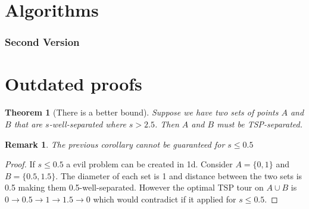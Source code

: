 \documentclass{article}
\newtheorem{thm}{Theorem}[section]
\newtheorem*{rem*}{Remark}
\theoremstyle{definition}
\begin{document}
\section{Algorithms}











\subsubsection{Second Version}



\appendix
\section{Outdated proofs}
\begin{thm}[There is a better bound]
    Suppose we have two sets of points $A$ and $B$ that are $s$-well-separated where $s > 2.5$. Then $A$ and $B$ must be TSP-separated.
\end{thm}

\begin{rem*}
    The previous corollary cannot be guaranteed for $s \leq 0.5$
\end{rem*}
\begin{proof}
    If $s \leq 0.5$ a evil problem can be created in 1d. 
    Consider $A=\{0,1\}$ and $B=\{0.5,1.5\}$. 
    The diameter of each set is 1 and distance between the two sets is 0.5 making them 0.5-well-separated.
    However the optimal TSP tour on $A \cup B$ is $0 \to 0.5 \to 1 \to 1.5 \to 0$ which would contradict  if it applied for $s \leq 0.5$.
\end{proof}
\end{document}
